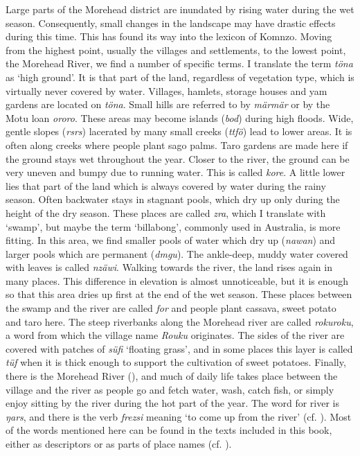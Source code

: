 Large parts of the Morehead district are inundated by rising water during the wet season. Consequently, small changes in the landscape may have drastic effects during this time. This has found its way into the lexicon of Komnzo. Moving from the highest point, usually the villages and settlements, to the lowest point, the Morehead River, we find a number of specific terms. I translate the term \emph{töna} as `high ground'. It is that part of the land, regardless of vegetation type, which is virtually never covered by water. Villages, hamlets, storage houses and yam gardens are located on \emph{töna}. Small hills are referred to by \emph{märmär} or by the Motu loan \emph{ororo}. These areas may become islands (\emph{bod}) during high floods. Wide, gentle slopes (\emph{rsrs}) lacerated by many small creeks (\emph{ttfö}) lead to lower areas. It is often along creeks where people plant sago palms. Taro gardens are made here if the ground stays wet throughout the year. Closer to the river, the ground can be very uneven and bumpy due to running water. This is called \emph{kore}. A little lower lies that part of the land which is always covered by water during the rainy season. Often backwater stays in stagnant pools, which dry up only during the height of the dry season. These places are called \emph{zra}, which I translate with `swamp', but maybe the term `billabong', commonly used in Australia, is more fitting. In this area, we find smaller pools of water which dry up (\emph{nawan}) and larger pools which are permanent (\emph{dmgu}). The ankle-deep, muddy water covered with leaves is called \emph{nzäwi}. Walking towards the river, the land rises again in many places. This difference in elevation is almost unnoticeable, but it is enough so that this area dries up first at the end of the wet season. These places between the swamp and the river are called \emph{for} and people plant cassava, sweet potato and taro here. The steep riverbanks along the Morehead river are called \emph{rokuroku}, a word from which the village name \textit{Rouku} originates. The sides of the river are covered with patches of \emph{süfi} `floating grass', and in some places this layer is called \emph{tüf} when it is thick enough to support the cultivation of sweet potatoes. Finally, there is the Morehead River (), and much of daily life takes place between the village and the river as people go and fetch water, wash, catch fish, or simply enjoy sitting by the river during the hot part of the year. The word for river is \emph{ŋars}, and there is the verb \textit{frezsi} meaning ‘to come up from the river’ (cf. ). Most of the words mentioned here can be found in the texts included in this book, either as descriptors or as parts of place names (cf. ).

